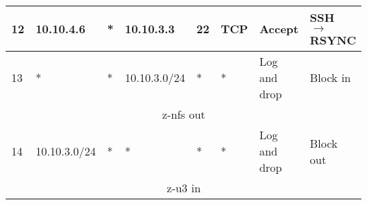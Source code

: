 \documentclass[a4paper, 11pt, oneside]{article}
\begin{document}
\begin{table}[H]
{\begin{tabular}{|llllllll|}
\multicolumn{1}{|l|}{12}          & \multicolumn{1}{l|}{10.10.4.6}                                                    & \multicolumn{1}{l|}{*}                                                              & \multicolumn{1}{l|}{10.10.3.3}                                                      & \multicolumn{1}{l|}{22}                                                                  & \multicolumn{1}{l|}{TCP}               & \multicolumn{1}{l|}{Accept}          & SSH $\rightarrow$ RSYNC                \\ \hline
\multicolumn{1}{|l|}{13}          & \multicolumn{1}{l|}{*}                                                            & \multicolumn{1}{l|}{*}                                                              & \multicolumn{1}{l|}{10.10.3.0/24}                                                      & \multicolumn{1}{l|}{*}                                                                   & \multicolumn{1}{l|}{*}                 & \multicolumn{1}{l|}{Log and drop}    & Block in                               \\ \hline
\multicolumn{8}{|c|}{{\color[HTML]{FE0000} z-nfs out}}                                                                                                                                                                                                                                                                                                                                                                                                                                                                   \\ \hline
\multicolumn{1}{|l|}{14}          & \multicolumn{1}{l|}{10.10.3.0/24}                                                 & \multicolumn{1}{l|}{*}                                                              & \multicolumn{1}{l|}{*}                                                                 & \multicolumn{1}{l|}{*}                                                                   & \multicolumn{1}{l|}{*}                 & \multicolumn{1}{l|}{Log and drop}    & Block out                              \\ \hline
\multicolumn{8}{|c|}{{\color[HTML]{FE0000} z-u3 in}}                                                                                                                                                                                                                                                                                                                                                                                                                                                                     \\ \hline

\end{tabular}}
\end{table}
\end{document}
